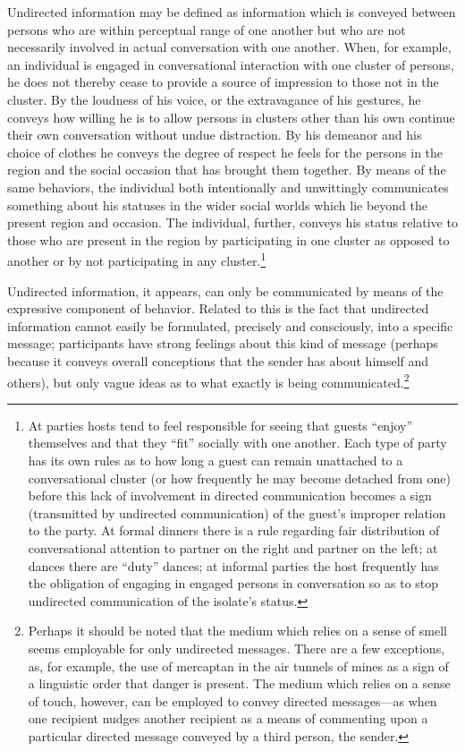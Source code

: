 \documentclass[openany,nobib]{tufte-book}
\begin{document}
Undirected information may be defined as information which is conveyed
between persons who are within perceptual range of one another but who
are not necessarily involved in actual conversation with one another.
When, for example, an individual is engaged in conversational
interaction with one cluster of persons, he does not thereby cease to
provide a source of impression to those not in the cluster. By the
loudness of his voice, or the extravagance of his gestures, he conveys
how willing he is to allow persons in clusters other than his own
continue their own conversation without undue distraction. By his
demeanor and his choice of clothes he conveys the degree of respect he
feels for the persons in the region and the social occasion that has
brought them together. By means of the same behaviors, the individual
both intentionally and unwittingly communicates something about his
statuses in the wider social worlds which lie beyond the present region
and occasion. The individual, further, conveys his status relative to
those who are present in the region by participating in one cluster as
opposed to another or by not participating in any cluster.\footnote{At
  parties hosts tend to feel responsible for seeing that guests
  ``enjoy'' themselves and that they ``fit'' socially with one another.
  Each type of party has its own rules as to how long a guest can remain
  unattached to a conversational cluster (or how frequently he may
  become detached from one) before this lack of involvement in directed
  communication becomes a sign (transmitted by undirected communication)
  of the guest's improper relation to the party. At formal dinners there
  is a rule regarding fair distribution of conversational attention to
  partner on the right and partner on the left; at dances there are
  ``duty'' dances; at informal parties the host frequently has the
  obligation of engaging in engaged persons in conversation so as to
  stop undirected communication of the isolate's status.}

Undirected information, it appears, can only be communicated by means of
the expressive component of behavior. Related to this is the fact that
undirected information cannot easily be formulated, precisely and
consciously, into a specific message; participants have strong feelings
about this kind of message (perhaps because it conveys overall
conceptions that the sender has about himself and others), but only
vague ideas as to what exactly is being communicated.\footnote{Perhaps
  it should be noted that the medium which relies on a sense of smell
  seems employable for only undirected messages. There are a few
  exceptions, as, for example, the use of mercaptan in the air tunnels
  of mines as a sign of a linguistic order that danger is present. The
  medium which relies on a sense of touch, however, can be employed to
  convey directed messages---as when one recipient nudges another
  recipient as a means of commenting upon a particular directed message
  conveyed by a third person, the sender.}
\end{document}
